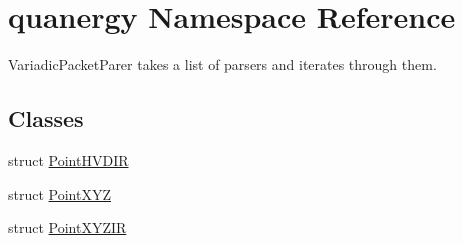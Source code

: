 \hypertarget{namespacequanergy}{\section{quanergy Namespace Reference}
\label{namespacequanergy}
}


Variadic\-Packet\-Parer takes a list of parsers and iterates through them.  


\subsection*{Classes}
\begin{DoxyCompactItemize}
\item 
struct \hyperlink{structquanergy_1_1PointHVDIR}{Point\-H\-V\-D\-I\-R}
\item 
struct \hyperlink{structquanergy_1_1PointXYZ}{Point\-X\-Y\-Z}
\item 
struct \hyperlink{structquanergy_1_1PointXYZIR}{Point\-X\-Y\-Z\-I\-R}
\end{DoxyCompactItemize}
